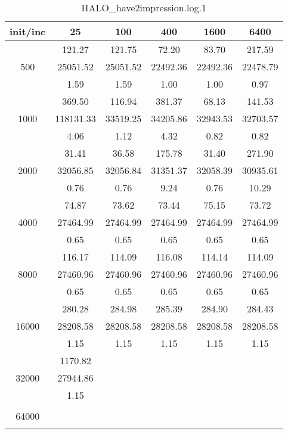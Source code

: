 \begin{table}[th]
\caption{HALO\_have2impression.log.1}
\label{tab:HALO_have2impression.log.1}
\centering
\begin{tabular}{|c||c|c|c|c|c|}
\hline
init/inc & 25 & 100 & 400 & 1600 & 6400 \\ \hline \hline
  & 121.27 & 121.75 & 72.20 & 83.70 & 217.59\\ 
500  & 25051.52 & 25051.52 & 22492.36 & 22492.36 & 22478.79\\ 
  & 1.59 & 1.59 & 1.00 & 1.00 & 0.97\\ \hline 
  & 369.50 & 116.94 & 381.37 & 68.13 & 141.53\\ 
1000  & 118131.33 & 33519.25 & 34205.86 & 32943.53 & 32703.57\\ 
  & 4.06 & 1.12 & 4.32 & 0.82 & 0.82\\ \hline 
  & 31.41 & 36.58 & 175.78 & 31.40 & 271.90\\ 
2000  & 32056.85 & 32056.84 & 31351.37 & 32058.39 & 30935.61\\ 
  & 0.76 & 0.76 & 9.24 & 0.76 & 10.29\\ \hline 
  & 74.87 & 73.62 & 73.44 & 75.15 & 73.72\\ 
4000  & 27464.99 & 27464.99 & 27464.99 & 27464.99 & 27464.99\\ 
  & 0.65 & 0.65 & 0.65 & 0.65 & 0.65\\ \hline 
  & 116.17 & 114.09 & 116.08 & 114.14 & 114.09\\ 
8000  & 27460.96 & 27460.96 & 27460.96 & 27460.96 & 27460.96\\ 
  & 0.65 & 0.65 & 0.65 & 0.65 & 0.65\\ \hline 
  & 280.28 & 284.98 & 285.39 & 284.90 & 284.43\\ 
16000  & 28208.58 & 28208.58 & 28208.58 & 28208.58 & 28208.58\\ 
  & 1.15 & 1.15 & 1.15 & 1.15 & 1.15\\ \hline 
  & 1170.82 &  &  &  & \\ 
32000  & 27944.86 &  &  &  & \\ 
  & 1.15 &  &  &  & \\ \hline 
  &  &  &  &  & \\ 
64000  &  &  &  &  & \\ 
  &  &  &  &  & \\ \hline 
\end{tabular}
\end{table}

